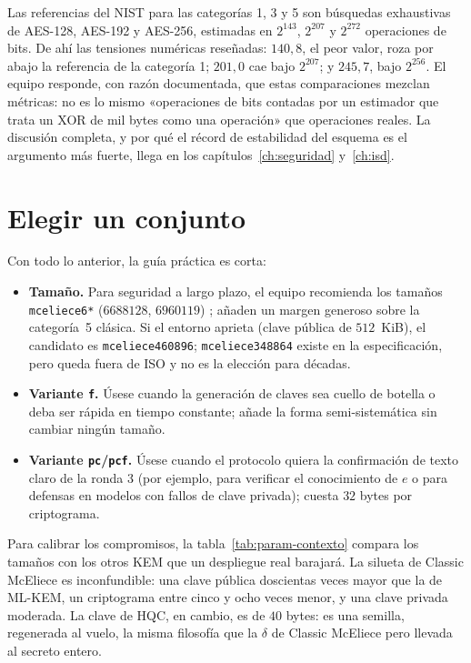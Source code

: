 Las referencias del NIST para las categorías 1, 3 y 5 son búsquedas
exhaustivas de AES-128, AES-192 y AES-256, estimadas en $2^{143}$,
$2^{207}$ y $2^{272}$ operaciones de bits. De ahí las tensiones
numéricas reseñadas: $140{,}8$, el peor valor, roza por abajo la
referencia de la categoría 1; $201{,}0$ cae bajo $2^{207}$; y
$245{,}7$, bajo $2^{256}$. El equipo responde, con razón documentada,
que estas comparaciones mezclan métricas: no es lo mismo «operaciones
de bits contadas por un estimador que trata un XOR de mil bytes como
una operación» que operaciones reales. La discusión completa, y por
qué el récord de estabilidad del esquema es el argumento más fuerte,
llega en los capítulos~\ref{ch:seguridad} y~\ref{ch:isd}.

\section{Elegir un conjunto}\label{sec:param-elegir}

Con todo lo anterior, la guía práctica es corta:

\begin{itemize}[leftmargin=1.5em,itemsep=3pt]
  \item \textbf{Tamaño.} Para seguridad a largo plazo, el equipo
        recomienda los tamaños \texttt{mceliece6*}
        ($6688128$, $6960119$) \cite{cmiso}; añaden un margen
        generoso sobre la categoría~5 clásica. Si el entorno aprieta
        (clave pública de $512$~KiB), el candidato es
        \texttt{mceliece460896}; \texttt{mceliece348864} existe en la
        especificación, pero queda fuera de ISO y no es la elección
        para décadas.
  \item \textbf{Variante \texttt{f}.} Úsese cuando la generación de
        claves sea cuello de botella o deba ser rápida en tiempo
        constante; añade la forma semi-sistemática sin cambiar
        ningún tamaño.
  \item \textbf{Variante \texttt{pc}/\texttt{pcf}.} Úsese cuando el
        protocolo quiera la confirmación de texto claro de la ronda 3
        (por ejemplo, para verificar el conocimiento de $e$ o para
        defensas en modelos con fallos de clave privada); cuesta
        $32$ bytes por criptograma.
\end{itemize}

Para calibrar los compromisos, la tabla~\ref{tab:param-contexto}
compara los tamaños con los otros KEM que un despliegue real barajará.
La silueta de Classic McEliece es inconfundible: una clave pública
doscientas veces mayor que la de ML-KEM, un criptograma entre cinco y
ocho veces menor, y una clave privada moderada. La clave de HQC, en
cambio, es de $40$ bytes: es una semilla, regenerada al vuelo, la
misma filosofía que la $\delta$ de Classic McEliece pero llevada al
secreto entero.

